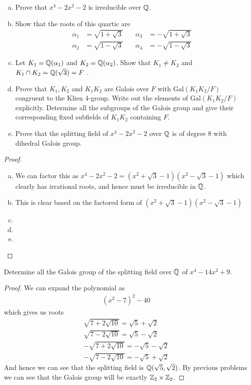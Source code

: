 \documentclass[num=11,duedate=04-21-21,course=Algebra\ II,proflastname=Walton]{hwtemplate}
\begin{document}
\problem[5]
\begin{claim} %
	\begin{enumerate}[(a).]
		\item Prove that \(x^{4}-2x^2-2\) is irreducible over \(\mathbb{Q}\).
		\item Show that the roots of this quartic are
			\begin{align*}
				\alpha_1 &= \sqrt{1+\sqrt{3} } \quad & \alpha_3 &= -\sqrt{1+\sqrt{3} } \\
				\alpha_2 &= \sqrt{1-\sqrt{3} } \quad & \alpha_4 &= -\sqrt{1-\sqrt{3} }
			\end{align*}
		\item Let \(K_1 = \mathbb{Q}(\alpha _1)\) and \(K_2 = \mathbb{Q}(\alpha_2)\). Show that \(K_1\neq K_2\) and \(K_1\cap K_2 = \mathbb{Q}(\sqrt{3} ) = F\) .
		\item Prove that \(K_1,K_2\) and \(K_1K_2\) are Galois over \(F\) with \(\textrm{Gal}(K_1K_2 / F)\) congruent to the Klien 4-group. Write out the elements of \(\textrm{Gal}(K_1K_2 / F)\) explicitly. Determine all the subgroups of the Galois group and give their corresponding fixed subfields of \(K_1K_2\) containing \(F\).
		\item Prove that the splitting field of \(x^{4}-2x^2-2\) over \(\mathbb{Q}\) is of degree 8 with dihedral Galois group.
	\end{enumerate}
\end{claim}
\begin{proof}
	\begin{enumerate}[(a).]
		\item We can factor this as \(x^{4}-2x^2-2 = (x^2+\sqrt{3} -1)(x^2-\sqrt{3} -1)\) which clearly has irrational roots, and hence must be irreducible in \(\mathbb{Q}\).
		\item This is clear based on the factored form of \((x^2+\sqrt{3} -1)(x^2-\sqrt{3} -1 )\) 
		\item 
		\item 
		\item 
	\end{enumerate}
\end{proof}

\problem[6]
\begin{claim} %
	Determine all the Galois group of the splitting field over \(\mathbb{Q}\) of \(x^{4}-14x^2+9\).
\end{claim}
\begin{proof}
	We can expand the polynomial as
	\begin{align*}
		(x^2-7)^2-40
	\end{align*}
	which gives us roots
	\begin{align*}
		\sqrt{7+2\sqrt{10} } = \sqrt{5} +\sqrt{2} \\
		\sqrt{7-2\sqrt{10} } = \sqrt{5} - \sqrt{2} \\
		-\sqrt{7+2\sqrt{10} } = -\sqrt{5} - \sqrt{2} \\
		-\sqrt{7-2\sqrt{10} } = -\sqrt{5} +\sqrt{2} 
	\end{align*}
	And hence we can see that the splitting field is \(\mathbb{Q}(\sqrt{5} ,\sqrt{2} )\). By previous problems we can see that the Galois group will be exactly \(\mathbb{Z}_2 \times \mathbb{Z}_2\).
\end{proof}
\end{document}
